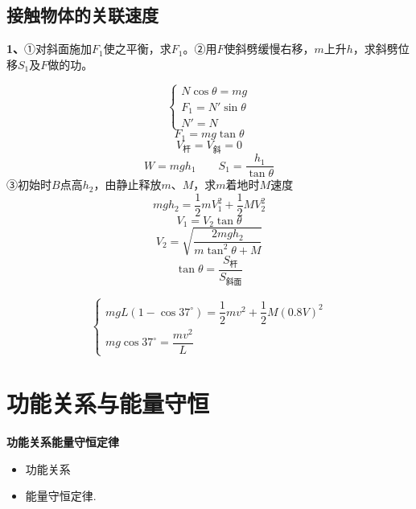 \subsection{接触物体的关联速度}
\begin{problem}[1]
\textbf{1、}①对斜面施加$F_1$使之平衡，求$F_1$。②用$F$使斜劈缓慢右移，$m$上升$h$，求斜劈位移$S_1$及$F$做的功。%
\begin{solution}
\[ \begin{cases}
N\cos\theta=mg\\
F_1=N'\sin\theta\\
N'=N
\end{cases} \]
\[ F_1=mg\tan\theta \]
\[ V_{\text{杆}}=V_{\text{斜}}=0 \]
\[ W=mgh_1\qquad S_1=\dfrac{h_1}{\tan\theta} \]
③初始时$B$点高$h_2$，由静止释放$m$、$M$，求$m$着地时$M$速度
\[ mgh_2=\dfrac{1}{2}mV_1^2+\dfrac{1}{2}MV_2^2 \]
\[ V_1=V_2\tan\theta \]
\[ V_2=\sqrt{\dfrac{2mgh_2}{m\tan^2\theta+M}} \]
\[ \tan\theta=\dfrac{S_{\text{杆}}}{S_{\text{斜面}}} \]
\end{solution}
\end{problem}

\[
\begin{cases}
mgL(1-\cos37^\circ)=\dfrac12mv^2+\dfrac12M(0.8V)^2\\[4pt]
mg\cos37^\circ=\dfrac{mv^2}{L}
\end{cases}
\]


\section{功能关系与能量守恒}
\textbf{功能关系\quad 能量守恒定律}
\begin{itemize}
\item 功能关系
\item 能量守恒定律.
\end{itemize}

